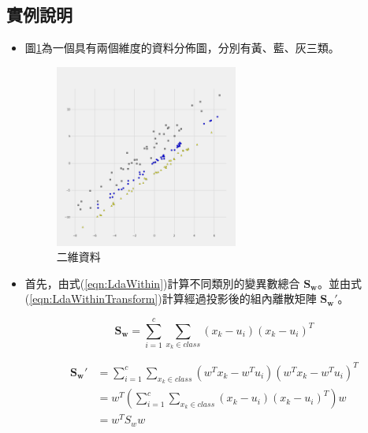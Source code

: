 \subsection{實例說明}
\begin{itemize}
	\item
	      圖\ref{fig:LdaDemostrate}為一個具有兩個維度的資料分佈圖，分別有黃、藍、灰三類。
	      \begin{figure}[h]
		      \centering
		      \includegraphics[width=6cm]{pic/lda_dataset.png}
		      \caption{二維資料}
		      \label{fig:LdaDemostrate}
	      \end{figure}


	\item
	      首先，由式(\ref{eqn:LdaWithin})計算不同類別的變異數總合 \(\mathbf{S_w}\)。並由式(\ref{eqn:LdaWithinTransform})計算經過投影後的組內離散矩陣 \(\mathbf{{S_w}'}\)。


	      \begin{equation}
		      \label{eqn:LdaWithin}
		      \mathbf{S_w}  =\sum_{i=1}^{c} \sum^{}_{x_k\in class}  (x_k - u_i)(x_k-u_i)^T
	      \end{equation}

	      \begin{equation}
		      \label{eqn:LdaWithinTransform}
		      \begin{aligned}
			      \mathbf{{S_w}'} & =\sum_{i=1}^{c} \sum^{}_{x_k\in class}  (w^Tx_k - w^Tu_i)(w^Tx_k-w^Tu_i)^T
			      \\& =w^T(\sum_{i=1}^{c} \sum^{}_{x_k\in class}  (x_k - u_i)(x_k-u_i)^T)w
			      \\& =w^TS_ww
		      \end{aligned}
	      \end{equation}



\end{itemize}

